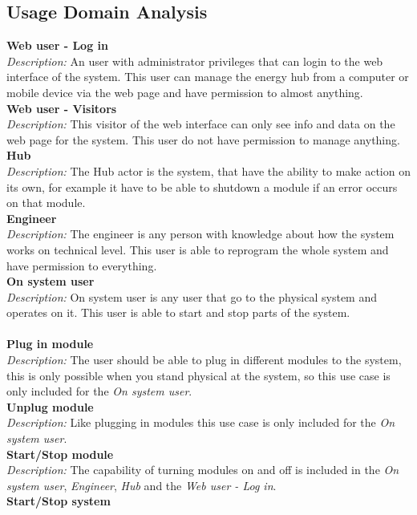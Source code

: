 	\subsection{Usage Domain Analysis}
		\textbf{Web user - Log in}
		\\\textit{Description: }
		An user with administrator privileges that can login to the web interface of the system. This user can manage the energy hub from a computer or mobile device
		 via the web page and have permission to almost anything.
		\\\textbf{Web user - Visitors}
		\\\textit{Description: }
		This visitor of the web interface can only see info and data on the web page for the system. This user do not have permission to manage anything.
		\\\textbf{Hub}
		\\\textit{Description: }
		The Hub actor is the system, that have the ability to make action on its own, for example it have to be able to shutdown a module if an error occurs on that module.
		\\\textbf{Engineer}
		\\\textit{Description: }
		The engineer is any person with knowledge about how the system works on technical level. This user is able to reprogram the whole system and have permission to everything.
		\\\textbf{On system user}
		\\\textit{Description: }
		On system user is any user that go to the physical system and operates on it. This user is able to start and stop parts of the system.
		\\\\\textbf{Plug in module}
		\\\textit{Description: }
		The user should be able to plug in different modules to the system, this is only possible when you stand physical at the system, so this use case is only included for the \textit{On system user}.
		\\\textbf{Unplug module}
		\\\textit{Description: }
		Like plugging in modules this use case is only included for the \textit{On system user}.
		\\\textbf{Start/Stop module}
		\\\textit{Description: }
		The capability of turning modules on and off is included in the \textit{On system user}, \textit{Engineer}, \textit{Hub} and the \textit{Web user - Log in}.
		\\\textbf{Start/Stop system}
